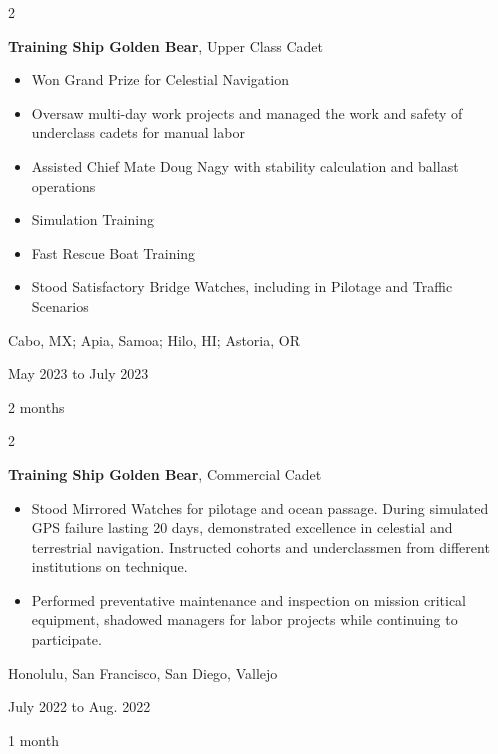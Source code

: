 \documentclass[10pt, letterpaper]{article}
\newenvironment{highlights}{
    \begin{itemize}[
        topsep=0.10 cm,
        parsep=0.10 cm,
        partopsep=0pt,
        itemsep=0pt,
        leftmargin=0.4 cm + 10pt
    ]
}{
    \end{itemize}
} %
\newenvironment{twocolentry}[2][]{
    \onecolentry
    \def\secondColumn{#2}
    \setcolumnwidth{\fill, 4.5 cm}
    \begin{paracol}{2}
}{
    \switchcolumn \raggedleft \secondColumn
    \end{paracol}
    \endonecolentry
} %
\begin{document}
        \vspace{0.2 cm}

        \begin{twocolentry}{
            Cabo, MX; Apia, Samoa; Hilo, HI; Astoria, OR

        May 2023 to July 2023

        2 months
        }
            \textbf{Training Ship Golden Bear}, Upper Class Cadet
            \begin{highlights}
                \item Won Grand Prize for Celestial Navigation
                \item Oversaw multi-day work projects and managed the work and safety of underclass cadets for manual labor
                \item Assisted Chief Mate Doug Nagy with stability calculation and ballast operations
                \item Simulation Training
                \item Fast Rescue Boat Training
                \item Stood Satisfactory Bridge Watches, including in Pilotage and Traffic Scenarios
            \end{highlights}
        \end{twocolentry}


        \vspace{0.2 cm}

        \begin{twocolentry}{
            Honolulu, San Francisco, San Diego, Vallejo

        July 2022 to Aug. 2022

        1 month
        }
            \textbf{Training Ship Golden Bear}, Commercial Cadet
            \begin{highlights}
                \item Stood Mirrored Watches for pilotage and ocean passage. During simulated GPS failure lasting 20 days, demonstrated excellence in celestial and terrestrial navigation. Instructed cohorts and underclassmen from different institutions on technique.
                \item Performed preventative maintenance and inspection on mission critical equipment, shadowed managers for labor projects while continuing to participate.
            \end{highlights}
        \end{twocolentry}
\end{document}
